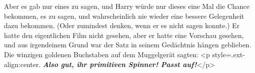 Aber es gab nur eines zu sagen, und Harry würde nur dieses eine Mal die Chance
bekommen, es zu sagen, und wahrscheinlich nie wieder eine bessere Gelegenheit
dazu bekommen. (Oder zumindest denken, wenn er es nicht sagen konnte.) Er hatte
den eigentlichen Film nicht gesehen, aber er hatte eine Vorschau gesehen, und
aus irgendeinem Grund war der Satz in seinem Gedächtnis hängen geblieben. Die
winzigen goldenen Buchstaben auf dem Muggelgerät sagten: <p
style=\grqq{}.ext-align:center\grqq{}. \textbf{\emph{ Also gut, ihr primitiven
Spinner! Passt auf!}}</p>

